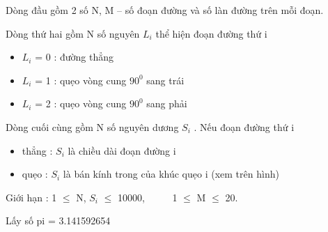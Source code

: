 Dòng đầu gồm 2 số N, M – số đoạn đường và số làn đường trên mỗi đoạn.

Dòng thứ hai gồm N số nguyên $L_{i}$ thể hiện đoạn đường thứ i
\begin{itemize}
	\item $L_{i}$ = 0 : đường thẳng
	\item $L_{i}$ = 1 : quẹo vòng cung $90^{0}$ sang trái
	\item $L_{i}$ = 2 : quẹo vòng cung $90^{0}$ sang phải
\end{itemize}

Dòng cuối cùng gồm N số nguyên dương $S_{i}$ . Nếu đoạn đường thứ i
\begin{itemize}
	\item thẳng : $S_{i}$ là chiều dài đoạn đường i
	\item quẹo : $S_{i}$ là bán kính trong của khúc quẹo i (xem trên hình)
\end{itemize}

Giới hạn : 1  $\le$  N, $S_{i}$  $\le$  10000,       1  $\le$  M  $\le$  20.

Lấy số pi = 3.141592654